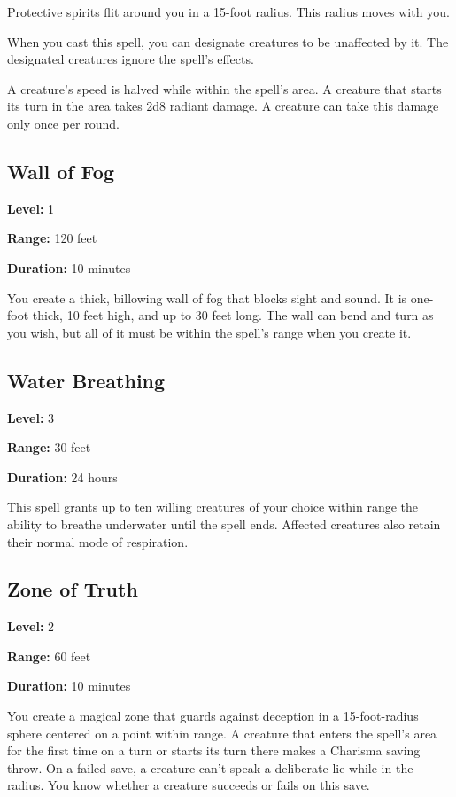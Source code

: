 \documentclass[12pt,letterpaper,twocolumn,openany,nodeprecatedcode,bg=none]{dndbook}
\let\oldsubsection\subsection
\renewcommand{\subsection}[1]{%
  \needspace{5\baselineskip}%
  \oldsubsection{#1}%
}
\begin{document}
Protective spirits flit around you in a 15-foot radius. This radius
moves with you.

When you cast this spell, you can designate creatures to be unaffected
by it. The designated creatures ignore the spell's effects.

A creature's speed is halved while within the spell's area. A creature
that starts its turn in the area takes 2d8 radiant damage. A creature
can take this damage only once per round.

\subsection{Wall of Fog}\label{wall-of-fog}

\textbf{Level:} 1

\textbf{Range:} 120 feet

\textbf{Duration:} 10 minutes

You create a thick, billowing wall of fog that blocks sight and sound.
It is one-foot thick, 10 feet high, and up to 30 feet long. The wall can
bend and turn as you wish, but all of it must be within the spell's
range when you create it.

\subsection{Water Breathing}\label{water-breathing}

\textbf{Level:} 3

\textbf{Range:} 30 feet

\textbf{Duration:} 24 hours

This spell grants up to ten willing creatures of your choice within
range the ability to breathe underwater until the spell ends. Affected
creatures also retain their normal mode of respiration.

\subsection{Zone of Truth}\label{zone-of-truth}

\textbf{Level:} 2

\textbf{Range:} 60 feet

\textbf{Duration:} 10 minutes

You create a magical zone that guards against deception in a
15-foot-radius sphere centered on a point within range. A creature that
enters the spell's area for the first time on a turn or starts its turn
there makes a Charisma saving throw. On a failed save, a creature can't
speak a deliberate lie while in the radius. You know whether a creature
succeeds or fails on this save.
\end{document}
